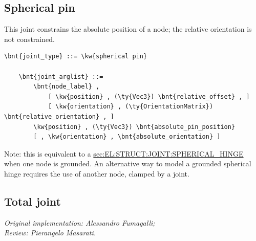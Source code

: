\subsection{Spherical pin}
This joint constrains the absolute position of a node;
the relative orientation is not constrained.
\begin{Verbatim}[commandchars=\\\{\}]
    \bnt{joint_type} ::= \kw{spherical pin}

    \bnt{joint_arglist} ::=
        \bnt{node_label} ,
            [ \kw{position} , (\ty{Vec3}) \bnt{relative_offset} , ]
            [ \kw{orientation} , (\ty{OrientationMatrix}) \bnt{relative_orientation} , ]
        \kw{position} , (\ty{Vec3}) \bnt{absolute_pin_position}
        [ , \kw{orientation} , \bnt{absolute_orientation} ]   
\end{Verbatim}
Note: this is equivalent to a
\hyperref{\kw{spherical hinge}}{\kw{spherical hinge} (see Section~}{)}{sec:EL:STRUCT:JOINT:SPHERICAL_HINGE}
when one node is grounded.
An alternative way to model a grounded spherical hinge requires
the use of another node, clamped by a  joint.

\subsection{Total joint}
\label{sec:EL:STRUCT:JOINT:TOTAL_JOINT}
\emph{Original implementation: Alessandro Fumagalli; \\
Review: Pierangelo Masarati.}

